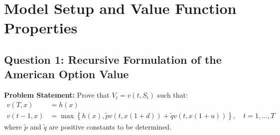 \section{Model Setup and Value Function Properties}

\subsection*{Question 1: Recursive Formulation of the American Option Value}

\textbf{Problem Statement:}
Prove that $V_t = v(t,S_t)$ such that:
\begin{align*}
v(T, x) &= h(x) \\
v(t-1, x) &= \max\left\{ h(x), \tilde{p} v(t, x(1+d)) + \tilde{q} v(t, x(1+u)) \right\}, \quad t=1,\dots,T
\end{align*}
where $\tilde{p}$ and $\tilde{q}$ are positive constants to be determined.

